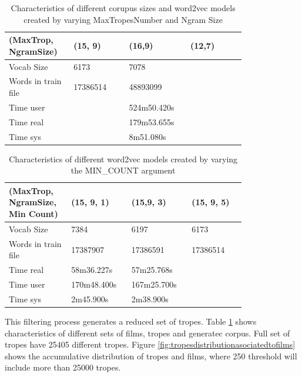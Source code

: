 \documentclass[letterpaper]{article}
\begin{document}
\begin{table}[t]
	\centering
	\begin{tabular}{|p{0.20\linewidth}|p{0.2\linewidth}|p{0.2\linewidth}|p{0.2\linewidth}|}
		\hline
		\textbf{(MaxTrop, NgramSize)}& \textbf{(15, 9)} & \textbf{(16,9)} & \textbf{(12,7)}\\
		\hline
		\hline
		Vocab Size& 6173 & 7078 & \\
		\hline
		Words in train file& 17386514 & 48893099 &  \\
		\hline
		Time user& &524m50.420s& \\
		\hline
		Time real& &179m53.655s& \\
		\hline
	    Time sys& &8m51.080s& \\
		\hline
		
	\end{tabular}
	\caption{Characteristics of different corupus sizes and word2vec models created by varying MaxTropesNumber and Ngram Size}
	\label{tab:corpusSize}
\end{table}
	
	
\begin{table}[t]
	\centering
	\begin{tabular}{|p{0.20\linewidth}|p{0.2\linewidth}|p{0.2\linewidth}|p{0.2\linewidth}|}
		\hline
		\textbf{(MaxTrop, NgramSize, Min Count)}& \textbf{(15, 9, 1)} & \textbf{(15,9, 3)} & \textbf{(15, 9, 5)}\\
		\hline
		\hline
		Vocab Size& 7384 & 6197 & 6173 \\
		\hline
		Words in train file& 17387907 & 17386591 & 17386514 \\
		\hline
		Time real&58m36.227s&57m25.768s&  \\
        \hline
		Time user&170m48.400s&167m25.700s& \\
		\hline
		Time sys&2m45.900s&2m38.900s& \\
		\hline
		
	\end{tabular}
	\caption{Characteristics of different word2vec models created by varying the MIN\_COUNT argument}
	\label{tab:variations-with-min-count-argument-15-9}
\end{table}	
	
	This filtering process generates a reduced set of tropes. Table \ref{tab:corpusSize} shows characteristics of different sets of films, tropes and generatec corpus. Full set of tropes have 25405 different tropes. Figure \ref{fig:tropesdistributionasociatedtofilms} shows the accumulative distribution of tropes and films, where 250 threshold will include more than 25000 tropes. 
	
\end{document}
